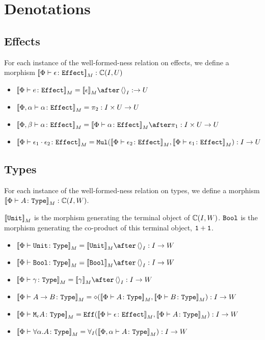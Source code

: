 \documentclass{report}
\begin{document}
\chapter{Denotations}
\section{Effects}
For each instance of the well-formed-ness relation on effects, we define a morphism ${\bf [\![}\Phi \vdash \epsilon \colon \texttt{Effect}{\bf ]\!]}_M: \mathbb{C}(I, U)$

\begin{itemize}
    \item $\deno{\typerelation{\P}{e}{\effect}} = \deno{\e} \after \term{I}: \rightarrow U$
    \item ${\bf [\![}\Phi,\alpha \vdash \alpha \colon \texttt{Effect}{\bf ]\!]}_M = \pi_2: I\times U \rightarrow U$
    
    \item $\deno{\typerelation{\P, \b}{\a}{\effect}} = \deno{\typerelation{\P}{\a}{\effect}}\after\p: I\times U\rightarrow U$
    
    \item ${\bf [\![}\Phi \vdash \epsilon_1\cdot \epsilon_2 \colon \texttt{Effect}{\bf ]\!]}_M = \texttt{Mul}({\bf [\![}\Phi \vdash \epsilon_2 \colon \texttt{Effect}{\bf ]\!]}_M,{\bf [\![}\Phi \vdash \epsilon_1 \colon \texttt{Effect}{\bf ]\!]}_M): I \rightarrow U$
\end{itemize}
\section{Types}
For each instance of the well-formed-ness relation on types, we define a morphism ${\bf [\![}\Phi \vdash A \colon \texttt{Type}{\bf ]\!]}_M: \mathbb{C}(I, W)$.

${\bf [\![}\texttt{Unit}{\bf ]\!]}_M$ is the morphism generating the terminal object of $\mathbb{C}(I, W)$. $\texttt{Bool}$ is the morphism generating the co-product of this terminal object, $\texttt{1} + \texttt{1}$.
\begin{itemize}
    \item $\deno{\typerelation{\P}{\U}{\type}} = \deno{\U}\after\term{I}: I \rightarrow W$
    
    \item $\deno{\typerelation{\P}{\B}{\type}} = \deno{\B}\after\term{I}: I \rightarrow W$
    
    \item $\deno{\typerelation{\P}{\g}{\type}} = \deno{\g}\after\term{I} : I \rightarrow W$
    
    \item ${\bf [\![}\Phi \vdash A\rightarrow B \colon \texttt{Type}{\bf ]\!]}_M = \diamond({\bf [\![}\Phi \vdash A \colon \texttt{Type}{\bf ]\!]}_M,{\bf [\![}\Phi \vdash B \colon \texttt{Type}{\bf ]\!]}_M): I \rightarrow W$
    
    \item ${\bf [\![}\Phi \vdash \texttt{M}_{\epsilon}{A} \colon \texttt{Type}{\bf ]\!]}_M =\texttt{Eff}({\bf [\![}\Phi \vdash \epsilon \colon \texttt{Effect}{\bf ]\!]}_M,{\bf [\![}\Phi \vdash A \colon \texttt{Type}{\bf ]\!]}_M): I \rightarrow W$
    \item ${\bf [\![}\Phi \vdash \forall \alpha. A \colon \texttt{Type}{\bf ]\!]}_M =\forall_I({\bf [\![}\Phi,\alpha \vdash A \colon \texttt{Type}{\bf ]\!]}_M): I \rightarrow W$
\end{itemize}
\end{document}
